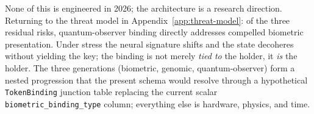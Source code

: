 \documentclass[11pt,letterpaper]{article}
\begin{document}
None of this is engineered in 2026; the architecture is a research direction. Returning to the threat model in Appendix~\ref{app:threat-model}: of the three residual risks, quantum-observer binding directly addresses compelled biometric presentation. Under stress the neural signature shifts and the state decoheres without yielding the key; the binding is not merely \textit{tied to} the holder, it \textit{is} the holder. The three generations (biometric, genomic, quantum-observer) form a nested progression that the present schema would resolve through a hypothetical \texttt{TokenBinding} junction table replacing the current scalar \texttt{biometric\_binding\_type} column; everything else is hardware, physics, and time.
\end{document}
